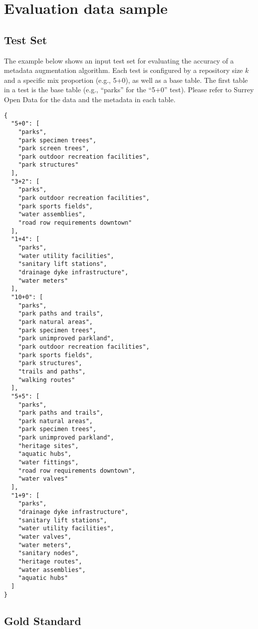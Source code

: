 \chapter{Evaluation data sample}

\section{Test Set}
\label{sec:TestSet}

The example below shows an input test set for evaluating the accuracy of a metadata augmentation algorithm. Each test is configured by a repository size $k$ and a specific mix proportion (e.g., 5+0), as well as a base table. The first table in a test is the base table (e.g., “parks” for the “5+0” test). Please refer to Surrey Open Data for the data and the metadata in each table.

\begin{lstlisting}
{
  "5+0": [
    "parks",
    "park specimen trees",
    "park screen trees",
    "park outdoor recreation facilities",
    "park structures"
  ],
  "3+2": [
    "parks",
    "park outdoor recreation facilities",
    "park sports fields",
    "water assemblies",
    "road row requirements downtown"
  ],
  "1+4": [
    "parks",
    "water utility facilities",
    "sanitary lift stations",
    "drainage dyke infrastructure",
    "water meters"
  ],
  "10+0": [
    "parks",
    "park paths and trails",
    "park natural areas",
    "park specimen trees",
    "park unimproved parkland",
    "park outdoor recreation facilities",
    "park sports fields",
    "park structures",
    "trails and paths",
    "walking routes"
  ],
  "5+5": [
    "parks",
    "park paths and trails",
    "park natural areas",
    "park specimen trees",
    "park unimproved parkland",
    "heritage sites",
    "aquatic hubs",
    "water fittings",
    "road row requirements downtown",
    "water valves"
  ],
  "1+9": [
    "parks",
    "drainage dyke infrastructure",
    "sanitary lift stations",
    "water utility facilities",
    "water valves",
    "water meters",
    "sanitary nodes",
    "heritage routes",
    "water assemblies",
    "aquatic hubs"
  ]
}
\end{lstlisting}

\section{Gold Standard}
\label{sec:Gold Standard}

